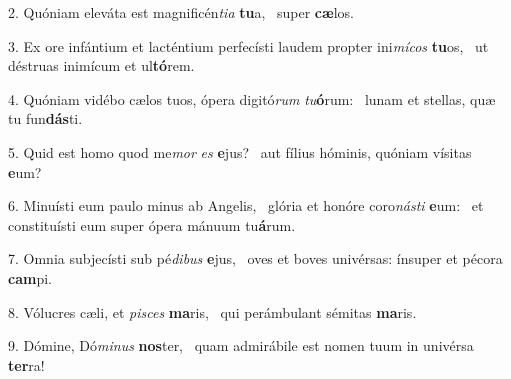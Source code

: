 2. Quóniam eleváta est magnificén\textit{ti}\textit{a} \textbf{tu}a, \ast\  super \textbf{cæ}los.\

3. Ex ore infántium et lacténtium perfecísti laudem propter ini\textit{mí}\textit{cos} \textbf{tu}os, \ast\  ut déstruas inimícum et ul\textbf{tó}rem.\

4. Quóniam vidébo cælos tuos, ópera digitó\textit{rum} \textit{tu}\textbf{ó}rum: \ast\  lunam et stellas, quæ tu fun\textbf{dás}ti.\

5. Quid est homo quod me\textit{mor} \textit{es} \textbf{e}jus? \ast\  aut fílius hóminis, quóniam vísitas \textbf{e}um?\

6. Minuísti eum paulo minus ab Angelis, \dag\  glória et honóre coro\textit{nás}\textit{ti} \textbf{e}um: \ast\  et constituísti eum super ópera mánuum tu\textbf{á}rum.\

7. Omnia subjecísti sub pé\textit{di}\textit{bus} \textbf{e}jus, \ast\  oves et boves univérsas: ínsuper et pécora \textbf{cam}pi.\

8. Vólucres cæli, et \textit{pi}\textit{sces} \textbf{ma}ris, \ast\  qui perámbulant sémitas \textbf{ma}ris.\

9. Dómine, Dó\textit{mi}\textit{nus} \textbf{nos}ter, \ast\  quam admirábile est nomen tuum in univérsa \textbf{ter}ra!\


